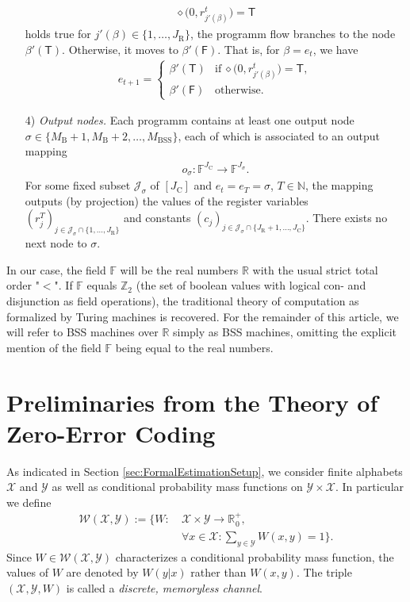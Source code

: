\documentclass[conference]{IEEEtran}
\def\X{{\mathcal X}}
\def\Y{{\mathcal Y}}
\def\J{{\mathcal J}}
\def\W{{\mathcal W}}
\def\NN{{\mathbb N}}
\def\RR{{\mathbb R}}
\def\ZZ{{\mathbb Z}}
\def\FF{{\mathbb F}}
\newcommand{\BSS}{\mathrm{BSS}}
\begin{document}
\begin{itemize}
						\begin{align*}	\diamond\big(0, r^t_{j'(\beta)}\big) = \mathsf{T} 
						\end{align*}
						holds true for \(j'(\beta) \in \{1,\ldots, J_\mathrm{R}\}\), the programm flow branches to the node \(\beta'(\mathsf{T})\). Otherwise, it moves to \(\beta'(\mathsf{F})\). 
						That is, for \(\beta = e_t\), we have
						\begin{align*}   e_{t+1} =   \begin{cases}   \beta'(\mathsf{T})  &\text{if}~\diamond\big(0,r^t_{j'(\beta)}\big) = \mathsf{T},\\
																	\beta'(\mathsf{F})  &\text{otherwise}.
													\end{cases}    
						\end{align*}
					\item[4)] \emph{Output nodes.} Each programm contains at least one output node \(\sigma \in \{M_{\mathrm{B}} + 1, M_{\mathrm{B}} + 2,\ldots, M_\BSS\}\), 
						each of which is associated to an output mapping
						\begin{align*}	o_\sigma : \FF^{J_{\mathrm{C}}}\rightarrow \FF^{J_{\sigma}}.
						\end{align*}
						For some fixed subset \(\J_\sigma\) of \([J_\mathrm{C}]\) and \(e_t = e_T = \sigma\), \(T\in\NN\), the mapping outputs (by projection) the values of the 
						register variables \((r_j^T)_{j\in \J_\sigma \cap \{1,\ldots,J_\mathrm{R}\}}\) and constants \((c_j)_{j\in \J_\sigma \cap \{J_\mathrm{R}+1,\ldots,J_\mathrm{C}\}}\). 
						There exists no next node to \(\sigma\).
	\end{itemize}
	In our case, the field \(\FF\) will be the real numbers \(\RR\) with the usual strict total order "\(<\)". If \(\FF\) equals \(\ZZ_2\) (the set of boolean values with logical con- and disjunction 
	as field operations), the traditional theory of computation as formalized by Turing machines is recovered. For the remainder of this article, we will refer to BSS machines over \(\RR\) 
	simply as BSS machines, omitting the explicit mention of the field \(\FF\) being equal to the real numbers. 

\section{Preliminaries from the Theory of Zero-Error Coding}	\label{sec:PreliminariesZeroError}
	\noindent As indicated in Section \ref{sec:FormalEstimationSetup}, we consider finite alphabets \(\X\) and \(\Y\) as well as conditional probability mass functions on \(\Y\times\X\).
	In particular we define
	\begin{align*}	\W(\X,\Y)	:=	\Bigg\{ W: 	&~\X \times \Y \rightarrow\RR_{\hspace{1pt}0}^+, \\
												&~\forall x\in\X: \sum_{y\in\Y} W(x,y) = 1 \Bigg\}.
	\end{align*}
	Since \(W\in \W(\X,\Y)\) characterizes a conditional probability mass function, the values of \(W\) are denoted by \(W(y|x)\) rather than \(W(x,y)\).  
	The triple \((\X,\Y,W)\) is called a \emph{discrete, memoryless channel}. 
\end{document}
